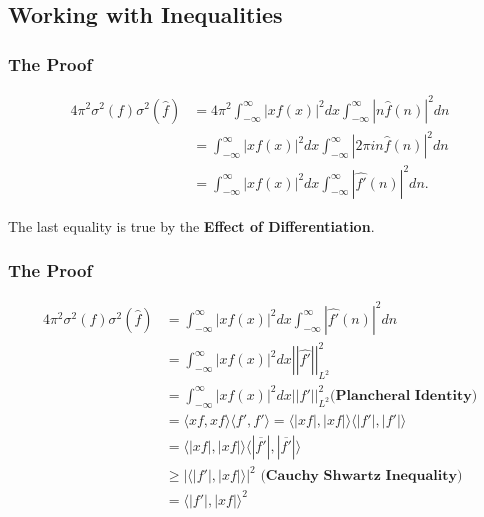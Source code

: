 \documentclass{beamer}
\newcommand{\h}[1]{\hat{#1}}
\newcommand{\aabs}[1]{\left\lvert\left\lvert #1\right\rvert\right\rvert}
\newcommand{\abs}[1]{\left\lvert #1\right\rvert}
\newcommand{\angles}[1]{\langle #1 \rangle}
\begin{document}
\subsection{Working with Inequalities}

\begin{frame}
    \frametitle{The Proof}

    \begin{align*}
        4 \pi^2 \sigma^2(f) \sigma^2(\h{f}) &= 4 \pi^2 \int_{-\infty}^{\infty} \abs{xf(x)}^2 dx \int_{-\infty}^{\infty} \abs{n \h{f}(n)}^2 d n \\
        &= \int_{-\infty}^{\infty} \abs{xf(x)}^2 dx \int_{-\infty}^{\infty} \abs{2 \pi i n \h{f}(n)}^2 d n \\
        &= \int_{-\infty}^{\infty} \abs{xf(x)}^2 dx \int_{-\infty}^{\infty} \abs{\h{f'}(n)}^2 d n. 
    \end{align*}

    The last equality is true by the \textbf{Effect of Differentiation}. 

\end{frame}

\begin{frame}
    \frametitle{The Proof}

    \begin{align*}
        4 \pi^2 \sigma^2(f) \sigma^2(\h{f}) &= \int_{-\infty}^{\infty} \abs{xf(x)}^2 dx \int_{-\infty}^{\infty} \abs{\h{f'}(n)}^2 d n \\
        &= \int_{-\infty}^{\infty} \abs{xf(x)}^2 dx \aabs{\h{f'}}_{L^2}^2 \\
        &= \int_{-\infty}^{\infty} \abs{xf(x)}^2 dx \aabs{f'}_{L^2}^2 \textbf{(Plancheral Identity)} \\
        &= \angles{xf, xf} \angles{f', f'} = \angles{\abs{xf}, \abs{xf}} \angles{\abs{f'}, \abs{f'}}\\ &= \angles{\abs{xf}, \abs{xf}}\angles{\abs{\overline{f'}}, \abs{\overline{f'}}} \\
        &\geq \abs{\angles{\abs{f'}, \abs{xf}}}^2 \textbf{ (Cauchy Shwartz Inequality)} \\
        &= \angles{\abs{f'}, \abs{xf}}^2
    \end{align*}


\end{frame}
\end{document}
